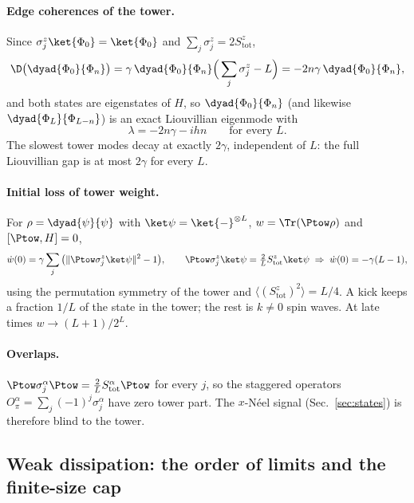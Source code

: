 \paragraph{Edge coherences of the tower.} Since $\sigma^z_j\ket{\Phi_0} = \ket{\Phi_0}$ and $\sum_j\sigma^z_j = 2S^z_{\mathrm{tot}}$,
\begin{equation}
\D\big(\dyad{\Phi_0}{\Phi_n}\big) = \gamma\,\dyad{\Phi_0}{\Phi_n}\Big(\sum_j\sigma^z_j - L\Big) = -2n\gamma\,\dyad{\Phi_0}{\Phi_n},
\end{equation}
and both states are eigenstates of $H$, so $\dyad{\Phi_0}{\Phi_n}$ (and likewise $\dyad{\Phi_L}{\Phi_{L-n}}$) is an exact Liouvillian eigenmode with
\begin{equation}
\lambda = -2n\gamma - i h n \qquad \text{for every } L.
\end{equation}
The slowest tower modes decay at exactly $2\gamma$, independent of $L$: the full Liouvillian gap is at most $2\gamma$ for every $L$.

\paragraph{Initial loss of tower weight.} For $\rho = \dyad{\psi}{\psi}$ with $\ket\psi = \ket{-}^{\otimes L}$, $w = \Tr(\Ptow\rho)$ and $[\Ptow,H] = 0$,
\begin{equation}
\dot w(0) = \gamma\sum_j\big(\lVert\Ptow\sigma^z_j\ket\psi\rVert^2 - 1\big), \qquad
\Ptow\sigma^z_j\ket\psi = \tfrac{2}{L}S^z_{\mathrm{tot}}\ket\psi
\;\Rightarrow\; \dot w(0) = -\gamma(L-1),
\label{eq:wdot}
\end{equation}
using the permutation symmetry of the tower and $\langle (S^z_{\mathrm{tot}})^2\rangle = L/4$. A kick keeps a fraction $1/L$ of the state in the tower; the rest is $k \ne 0$ spin waves. At late times $w \to (L+1)/2^L$.

\paragraph{Overlaps.} $\Ptow\sigma^\alpha_j\Ptow = \tfrac2L S^\alpha_{\mathrm{tot}}\Ptow$ for every $j$, so the staggered operators $O^\alpha_\pi = \sum_j (-1)^j\sigma^\alpha_j$ have zero tower part. The $x$-N\'eel signal (Sec.~\ref{sec:states}) is therefore blind to the tower.

\subsection{Weak dissipation: the order of limits and the finite-size cap}
\label{sec:theory-weak}

